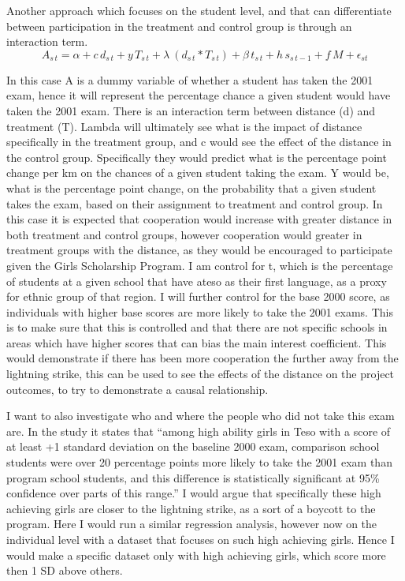 \documentclass{article}
\begin{document}
Another approach which focuses on the student level, and that can differentiate between participation in the treatment and control group is through an interaction term.
\[ A_{s\,t} = \alpha + c\,d_{s\,t} + y\,T_{s\,t} +  \lambda\ (d_{s\,t}* T_{s\,t})+\beta \,t_{s\,t}+h\, s_{s\,t-1}+ f\, M+ \epsilon_{s t}\]

In this case A is a dummy variable of whether a student has taken the 2001 exam, hence it will represent the percentage chance a given student would have taken the 2001 exam. There is an interaction term between distance (d) and treatment (T). Lambda will ultimately see what is the impact of distance specifically in the treatment group, and c would see the effect of the distance in the control group. Specifically they would predict what is the percentage point change per km on the chances of a given student taking the exam. Y would be, what is the percentage point change, on the probability that a given student takes the exam, based on their assignment to treatment and control group. In this case it is expected that cooperation would increase with greater distance in both treatment and control groups, however cooperation would greater in treatment groups with the distance, as they would be encouraged to participate given the Girls Scholarship Program. I am control for t, which is the percentage of students at a given school that have ateso as their first language, as a proxy for ethnic group of that region. I will further control for the base 2000 score, as individuals with higher base scores are more likely to take the 2001 exams. This is to make sure that this is controlled and that there are not specific schools in areas which have higher scores that can bias the main interest coefficient. This would demonstrate if there has been more cooperation the further away from the lightning strike, this can be used to see the effects of the distance on the project outcomes, to try to demonstrate a causal relationship. 

I want to also investigate who and where the people who did not take this exam are. In the study it states that “among high ability girls in Teso with a score of at least +1 standard deviation on the baseline 2000 exam, comparison school students were over 20 percentage points more likely to take the 2001 exam than program school students, and this difference is statistically significant at 95\% confidence over parts of this range.” I would argue that specifically these high achieving girls are closer to the lightning strike, as a sort of a boycott to the program. Here I would run a similar regression analysis, however now on the individual level with a dataset that focuses on such high achieving girls. Hence I would make a specific dataset only with high achieving girls, which score more then 1 SD above others. 
\end{document}
